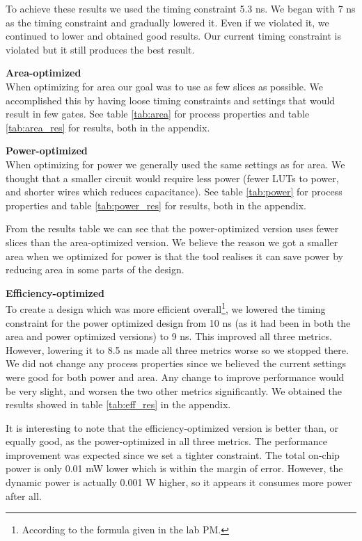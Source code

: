 \documentclass[a4paper,11pt]{article}
\begin{document}
To achieve these results we used the timing constraint 5.3 ns. We began with 7 ns as the timing constraint and gradually lowered it. Even if we violated it, we continued to lower and obtained good results. Our current timing constraint is violated but it still produces the best result.

\textbf{Area-optimized}\\
When optimizing for area our goal was to use as few slices as possible. We accomplished this by having loose timing constraints and settings that would result in few gates. See table \ref{tab:area} for process properties and table \ref{tab:area_res} for results, both in the appendix.

\textbf{Power-optimized}\\
When optimizing for power we generally used the same settings as for area. We thought that a smaller circuit would require less power (fewer LUTs to power, and shorter wires which reduces capacitance). See table \ref{tab:power} for process properties and table \ref{tab:power_res} for results, both in the appendix.

From the results table we can see that the power-optimized version uses fewer slices than the area-optimized version. We believe the reason we got a smaller area when we optimized for power is that the tool realises it can save power by reducing area in some parts of the design. 

\textbf{Efficiency-optimized}\\
To create a design which was more efficient overall\footnote{According to the formula given in the lab PM.}, we lowered the timing constraint for the power optimized design from 10 ns (as it had been in both the area and power optimized versions) to 9 ns. This improved all three metrics. However, lowering it to 8.5 ns made all three metrics worse so we stopped there. We did not change any process properties since we believed the current settings were good for both power and area. Any change to improve performance would be very slight, and worsen the two other metrics significantly. We obtained the results showed in table \ref{tab:eff_res} in the appendix.

It is interesting to note that the efficiency-optimized version is better than, or equally good, as the power-optimized in all three metrics. The performance improvement was expected since we set a tighter constraint. The total on-chip power is only 0.01 mW lower which is within the margin of error. However, the dynamic power is actually 0.001 W higher, so it appears it consumes more power after all.
\end{document}
